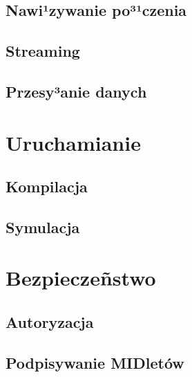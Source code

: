     \subsection{Nawi¹zywanie po³¹czenia}
    \subsection{Streaming}
    \subsection{Przesy³anie danych}

\section{Uruchamianie}
\label{sec:Uruchamianie}

  \subsection{Kompilacja}
    \label{sec:Kompilacja}
    \subsection{Symulacja}
    \label{sec:Symulacja}

\section{Bezpieczeñstwo}


    \subsection{Autoryzacja}
    \label{sec:Autoryzacja}
    \subsection{Podpisywanie MIDletów}
    \label{sec:Podpisywanie MIDletow}
